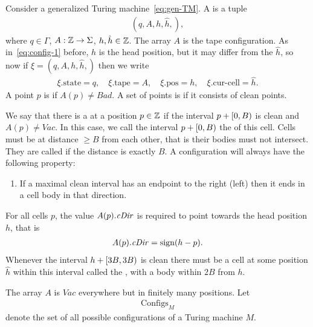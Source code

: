 \documentclass[12pt]{memoir}
\renewcommand{\ge}{\geq}
\newcommand{\fld}[1]{\ensuremath{\textit{#1\/}}}
\newcommand{\sign}{\mathop\mathrm{sign}}
\def\B{B}
\newcommand{\Bad}{\mathit{Bad}}
\newcommand{\Vacant}{\mathit{Vac}}
\newcommand{\Configs}{\mathrm{Configs}}
\newcommand{\h}{h}
\newcommand{\hc}{\hat h}
\newcommand{\pos}{\mathrm{pos}}
\newcommand{\curcell}{\textrm{cur-cell}}
\newcommand{\cDir}{\fld{cDir}}
\newcommand{\state}{\mathrm{state}}
\newcommand{\tape}{\mathrm{tape}}
\begin{document}
\begin{definition}[Configuration]\label{def:config}
     Consider a generalized Turing machine~\eqref{eq:gen-TM}.
    A  is a tuple
        \begin{align*}
             (q,A,\h,\hc,),
        \end{align*}
    where \( q\in\Gamma \), 
\( A:\mathbb{Z}\to\Sigma \), \( \h,\hc\in\bbZ \).
The array \( A \) is the tape configuration.
As in~\eqref{eq:config-1} before, \( \h \) is the head position, but it may differ from the 
\( \hc \), so now if \(  \xi= (q,A,\h,\hc,) \) then we write
        \begin{align}\label{eq:config-2}
             \xi.\state=q, \quad \xi.\tape=A, \quad \xi.\pos=\h,\quad \xi.\curcell=\hc. 
        \end{align}
A point \( p \) is  if  \( A(p)\ne\Bad \).
A set of points is  if it consists of clean points.

We say that there is a  at a position \( p\in\mathbb{Z} \) if the interval
\( p+\lint{0}{\B} \) is clean and \( A(p)\ne \Vacant \).
In this case, we call the interval \( p+\lint{0}{\B} \) the  of this cell.
Cells must be at distance \( \ge\B \) from each other, that is their
bodies must not intersect.
They are called  if the distance is exactly \( \B \).
A configuration will always have the following property:
\begin{enumerate}[label=\upshape{(C\arabic*)}, ref=C\arabic*]
\item\label{i:config.sharp-ends}
 If a maximal clean interval has an endpoint to the right (left) then it ends in a cell body in that direction.
\end{enumerate}
For all cells \( p \), the value \( A(p).\cDir \) is required to point towards 
the head position \( \h \), that is 
 \begin{align*}
   A(p).\cDir=\sign(\h-p).
 \end{align*}
Whenever the interval \( \h+\lint{3\B}{3\B} \) is clean there must be a
cell at some position \( \hc \) within this interval called the ,
with a body within \( 2\B \) from \( \h \).

The array \( A \) is \( \Vacant \) everywhere but in finitely many positions.
Let
    \begin{align*}
         \Configs_{M}
    \end{align*}
    denote the set of all possible configurations
    of a Turing machine \( M \).
\end{definition}
\end{document}
